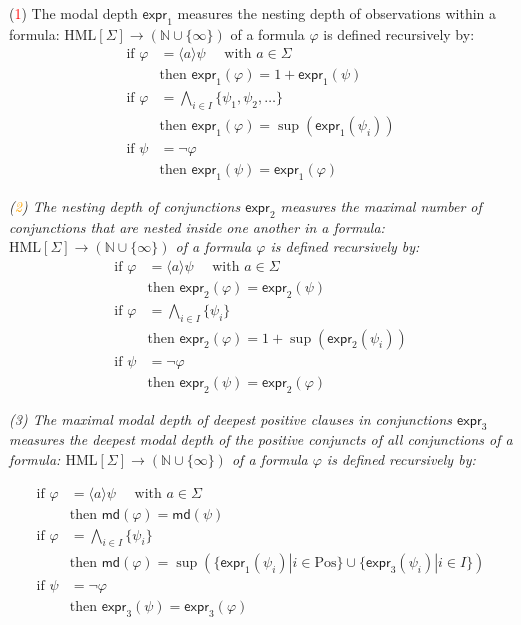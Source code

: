 \begin{isabellebody}
\begin{isamarkuptext}
{(\textcolor{red}{1}) The \textnormal{modal depth} $\textsf{expr}_1$ measures the nesting depth of observations within a formula: $\text{HML}[\Sigma] \rightarrow (\mathbb{N} \cup \{\infty\})$ of a formula $\varphi$ is defined recursively by:}
\textit{
\begin{align*}
    \text{if } \varphi &= \langle a \rangle \psi \quad \text{ with } a \in \Sigma \\
    &\text{then } \textsf{expr}_1(\varphi) = 1 + \textsf{expr}_1(\psi) \\
    \text{if } \varphi &= \bigwedge_{i \in I} \{ \psi_1, \psi_2, \ldots \} \\
    &\text{then } \textsf{expr}_1(\varphi) = \sup(\textsf{expr}_1(\psi_i)) \\
    \text{if } \psi &= \neg \varphi \\
    &\text{then } \textsf{expr}_1(\psi) = \textsf{expr}_1(\varphi)
\end{align*}
}


\textit{(\textcolor{orange}{2}) The \textnormal{nesting depth of conjunctions} $\textsf{expr}_2$ measures the maximal number of conjunctions that are nested inside one another in a formula: $\text{HML}[\Sigma] \rightarrow (\mathbb{N} \cup \{\infty\})$ of a formula $\varphi$ is defined recursively by:}
\textit{
\begin{align*}
    \text{if } \varphi &= \langle a \rangle \psi \quad \text{ with } a \in \Sigma \\
    & \text{then } \textsf{expr}_2(\varphi) = \textsf{expr}_2(\psi) \\
    \text{if } \varphi &= \bigwedge_{i \in I} \{\psi_i \} \\
    & \text{then } \textsf{expr}_2(\varphi) = 1 + \sup(\textsf{expr}_2(\psi_i)) \\
    \text{if } \psi &= \neg \varphi \\
    & \text{then } \textsf{expr}_2(\psi) = \textsf{expr}_2(\varphi)
\end{align*}
}

\textit{(\textcolor{myyellow}{3}) The \textnormal{maximal modal depth of deepest positive clauses in conjunctions} $\textsf{expr}_3$ measures the deepest modal depth of the positive conjuncts of all conjunctions of a formula: $\text{HML}[\Sigma] \rightarrow (\mathbb{N} \cup \{\infty\})$ of a formula $\varphi$ is defined recursively by:}

\textit{\begin{align*}
    \text{if } \varphi &= \langle a \rangle \psi \quad \text{ with } a \in \Sigma \\
    & \text{then } \textsf{md}(\varphi) = \textsf{md}(\psi) \\
    \text{if } \varphi &= \bigwedge_{i \in I} \{ \psi_i \} \\
    & \text{then } \textsf{md}(\varphi) = \sup(\{\textsf{expr}_1(\psi_i) | i \in \text{Pos}\} \cup \{\textsf{expr}_3(\psi_i) | i \in I\}) \\
    \text{if } \psi &= \neg \varphi \\
    & \text{then } \textsf{expr}_3(\psi) = \textsf{expr}_3(\varphi)
\end{align*}
}


\end{isamarkuptext}
\end{isabellebody}
